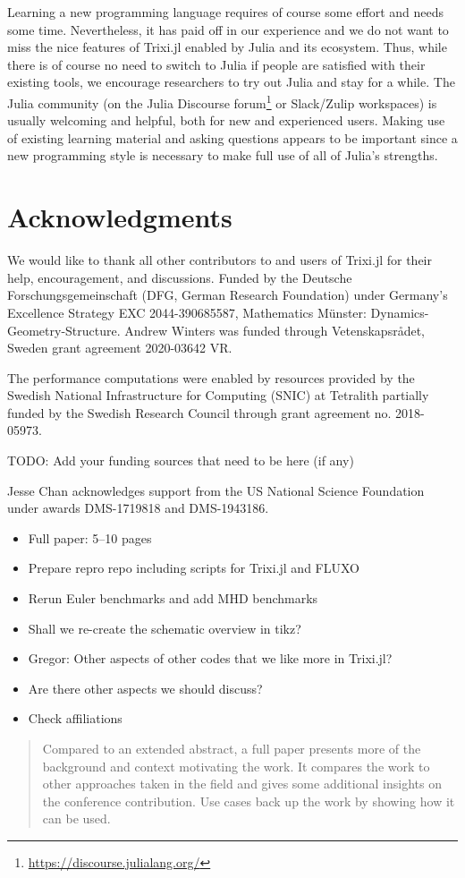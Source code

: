 \documentclass{juliacon}
\newcommand{\trixi}{Trixi.jl\xspace}
\newcommand{\todo}[1]{{\color{red}#1}}
\begin{document}
Learning a new programming language requires of course some effort and needs some
time. Nevertheless, it has paid off in our experience and we do not want to miss the
nice features of \trixi enabled by Julia and its ecosystem. Thus, while there is
of course no need to switch to Julia if people are satisfied with their existing
tools, we encourage researchers to try out Julia and stay for a while. The Julia
community (on the Julia Discourse forum\footnote{\url{https://discourse.julialang.org/}}
or Slack/Zulip workspaces) is usually welcoming and helpful, both for new and
experienced users. Making use of existing learning material and asking questions
appears to be important since a new programming style is necessary to make full
use of all of Julia's strengths.



\section*{Acknowledgments}

We would like to thank all other contributors to and users of \trixi for their
help, encouragement, and discussions.
Funded by the Deutsche Forschungsgemeinschaft (DFG, German Research Foundation)
under Germany's Excellence Strategy EXC 2044-390685587, Mathematics Münster:
Dynamics-Geometry-Structure.
Andrew Winters was funded through Vetenskapsr{\aa}det, Sweden grant
agreement 2020-03642 VR.

The performance computations were enabled by resources provided by the Swedish National
Infrastructure for Computing (SNIC) at Tetralith partially funded by the Swedish
Research Council through grant agreement no. 2018-05973.

\todo{TODO: Add your funding sources that need to be here (if any)} %

Jesse Chan acknowledges support from the US National Science Foundation under 
awards DMS-1719818 and DMS-1943186. 



\todo{ %
\begin{itemize}
  \item Full paper: 5--10 pages
  \item Prepare repro repo including scripts for \trixi and FLUXO
  \item Rerun Euler benchmarks and add MHD benchmarks
  \item Shall we re-create the schematic overview in tikz?
  \item Gregor: Other aspects of other codes that we like more in \trixi?
  \item Are there other aspects we should discuss?
  \item Check affiliations
\end{itemize}
\begin{quote}
  Compared to an extended abstract, a full paper presents more of the background
  and context motivating the work. It compares the work to other approaches taken
  in the field and gives some additional insights on the conference contribution.
  Use cases back up the work by showing how it can be used.
\end{quote}}
\end{document}
